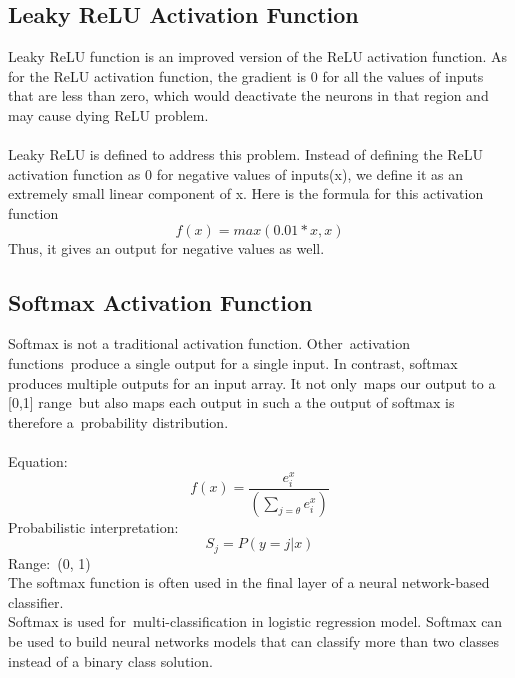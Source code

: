         \subsection{Leaky ReLU Activation Function}
        Leaky ReLU function is an improved version of the ReLU activation function. As for the ReLU activation function, the gradient is 0 for all the values of inputs that are less than zero, which would deactivate the neurons in that region and may cause dying ReLU problem.\\\\
        Leaky ReLU is defined to address this problem. Instead of defining the ReLU activation function as 0 for negative values of inputs(x), we define it as an extremely small linear component of x. Here is the formula for this activation function\\
        \begin{equation}
            f(x)=max(0.01*x , x)
        \end{equation}
        Thus, it gives an output for negative values as well. \\

        \subsection{Softmax Activation Function}
        Softmax is not a traditional activation function. Other activation functions produce a single output for a single input. In contrast, softmax produces multiple outputs for an input array.  It not only maps our output to a [0,1] range but also maps each output in such a the output of softmax is therefore a probability distribution.\\\\
\noindent
        Equation: 
        \begin{equation}
            f(x) =  \frac{e^x_i}{(\sum_{j=\theta} e^x_i)}
        \end{equation}
        Probabilistic interpretation: 
        \begin{equation}
            S_j = P(y=j|x)
        \end{equation}
        Range: (0, 1)\\
        The softmax function is often used in the final layer of a neural network-based classifier.\\
        Softmax is used for multi-classification in logistic regression model. Softmax can be used to build neural networks models that can classify more than two classes instead of a binary class solution.\\


